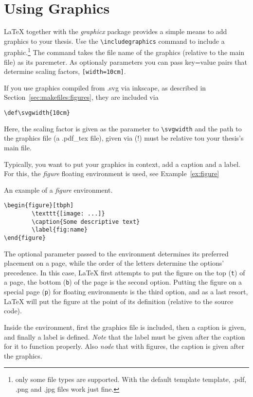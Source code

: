\section{Using Graphics}
\label{sec:guide:graphics}

\LaTeX{} together with the \emph{graphicx} package provides a simple means to
add graphics to your thesis.
Use the \verb+\includegraphics+ command to include a graphic.\footnote{only
some file types are supported. With the default \ac{template} template,
\mbox{.pdf}, \mbox{.png} and \mbox{.jpg} files work just fine.}
The command takes the file name of the graphics (relative to the main file) as
its paremeter.
As optionaly parameters you can pass key=value pairs that determine scaling
factors, \eg{} \verb+[width=10cm]+.

If you use graphics compiled from \mbox{.svg} via inkscape, as described in
Section~\ref{sec:makefiles:figures}, they are included via
\begin{verbatim}
\def\svgwidth{10cm}

\end{verbatim}
Here, the scaling factor is given as the parameter to \verb+\svgwidth+ and the
path to the graphics file (a \mbox{.pdf\_tex} file), given via \verb++(!)
must be relative tou your thesis's main file.

Typically, you want to put your graphics in context, \eg{} add a caption and a
label.
For this, the \emph{figure} floating environment is used, see
Example~\ref{ex:figure}
\begin{example}
\label{ex:figure}
An example of a \emph{figure} environment.
\begin{verbatim}
\begin{figure}[tbph]
        \texttt{[image: ...]}
        \caption{Some descriptive text}
        \label{fig:name}
\end{figure}
\end{verbatim}
The optional parameter passed to the environment determines its preferred
placement on a page, while the order of the letters determine the options'
precedence.
In this case, \LaTeX{} first attempts to put the figure on the top (\verb+t+)
of a page, the bottom (\verb+b+) of the page is the second option.
Putting the figure on a special page (\verb+p+) for floating environments is
the third option, and as a last resort, \LaTeX{} will put the figure at the
point of its definition (relative to the source code).

Inside the environment, first the graphics file is included, then a caption is
given, and finally a label is defined.
\emph{Note} that the label must be given after the caption for it to function
properly.
Also \emph{node} that with figures, the caption is given after the graphics.
\end{example}

